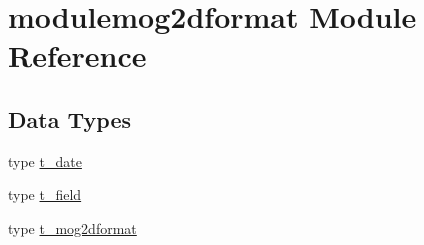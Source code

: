 \hypertarget{namespacemodulemog2dformat}{}\section{modulemog2dformat Module Reference}
\label{namespacemodulemog2dformat}
\subsection*{Data Types}
\begin{DoxyCompactItemize}
\item 
type \mbox{\hyperlink{structmodulemog2dformat_1_1t__date}{t\+\_\+date}}
\item 
type \mbox{\hyperlink{structmodulemog2dformat_1_1t__field}{t\+\_\+field}}
\item 
type \mbox{\hyperlink{structmodulemog2dformat_1_1t__mog2dformat}{t\+\_\+mog2dformat}}
\end{DoxyCompactItemize}
